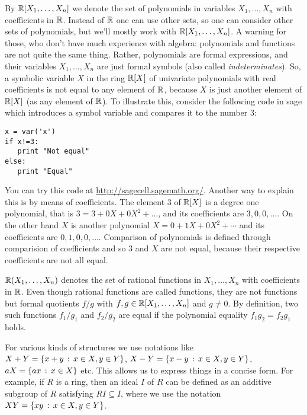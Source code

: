 By $\mathbb{R}[X_1,\ldots,X_n]$ we denote the set of polynomials in variables $X_1,\ldots,X_n$ with coefficients in $\mathbb{R}$. Instead of $\mathbb{R}$ one can use other sets, so one can consider other sets of polynomials, but we'll mostly work with $\mathbb{R}[X_1,\ldots,X_n]$. A warning for those, who don't have much experience with algebra: polynomials and functions are not quite the same thing. Rather, polynomials are formal expressions, and their variables $X_1,\ldots,X_n$ are just formal symbols (also called \emph{indeterminates}). So, a symbolic variable $X$ in the ring $\mathbb{R}[X]$ of univariate polynomials with real coefficients is not equal to any element of $\mathbb{R}$, because $X$ is just another element of $\mathbb{R}[X]$ (as any element of $\mathbb{R}$). To illustrate this, consider the following code in sage which introduces a symbol variable and compares it to the number $3$: 

\begin{verbatim}
x = var('x')
if x!=3:
   print "Not equal"
else:
   print "Equal"
\end{verbatim}

You can try this code at \url{http://sagecell.sagemath.org/}. Another way to explain this is by means of coefficients. The element $3$ of $\mathbb{R}[X]$ is a degree one polynomial, that is $3 = 3 + 0 X + 0 X^2 + \ldots $, and its coefficients are $3, 0, 0, \ldots$. On the other hand $X$ is another polynomial $X = 0  + 1 X + 0 X^2 + \cdots$ and its coefficients are $0, 1,0 , 0, \ldots$. Comparison of polynomials is defined through comparision of coefficients and so $3$ and $X$ are not equal, because their respective coefficients are not all equal. 

$\mathbb{R}(X_1,\ldots,X_n)$ denotes the set of rational functions in $X_1,\ldots,X_n$ with coefficients in $\mathbb{R}$. Even though rational functions are called functions, they are not functions but formal quotients $f/g$ with $f, g \in \mathbb{R}[X_1,\ldots,X_n]$ and $g \ne 0$. By definition, two such functions $f_1/ g_1$ and $f_2/g_2$ are equal if the polynomial equality $f_1 g_2 = f_2 g_1$ holds. 

For various kinds of structures  we use notations like $X + Y = \left\{  x + y \,:\, x \in X, y \in Y \right\}$, $X - Y = \left\{ x - y \,:\, x \in X, y \in Y \right\}$, $a X = \left\{  a x  \,:\, x \in X \right\}$ etc. This allows us to express things in a concise form. For example, if $R$ is a ring, then an ideal $I$ of $R$ can be defined as an additive subgroup of $R$ satisfying $R I \subseteq I$, where we use the notation $X Y = \left\{ x y  \,:\, x \in  X, y \in Y \right\}$. 


